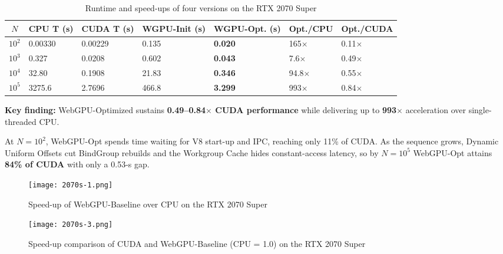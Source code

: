 \documentclass[PhD]{PHlab-thesis}
\begin{document}
\begin{table}[h]
    \centering
    \begin{tabularx}{\textwidth}{|c|X|X|X|X|X|X|}
        \hline
        \setlength{\tabcolsep}{4pt}         %
        \renewcommand{\arraystretch}{2}   %
        \small    
        $N$ & CPU T (s) & CUDA T (s) & WGPU-Init (s) & \textbf{WGPU-Opt. (s)} & Opt./CPU & Opt./CUDA \\
        \hline
        $10^2$ & 0.00330 & 0.00229 & 0.135 & \textbf{0.020} & 165$\times$ & 0.11$\times$ \\
        $10^3$ & 0.327 & 0.0208 & 0.602 & \textbf{0.043} & 7.6$\times$ & 0.49$\times$ \\
        $10^4$ & 32.80 & 0.1908 & 21.83 & \textbf{0.346} & 94.8$\times$ & 0.55$\times$ \\
        $10^5$ & 3275.6 & 2.7696 & 466.8 & \textbf{3.299} & 993$\times$ & 0.84$\times$ \\
        \hline
    \end{tabularx}
    \caption{Runtime and speed-ups of four versions on the RTX 2070 Super}
    \label{tab:rtx_performance}
\end{table}

\textbf{Key finding:} WebGPU-Optimized sustains \textbf{0.49–0.84$\times$ CUDA performance} while delivering up to \textbf{993$\times$} acceleration over single-threaded CPU.

At $N=10^2$, WebGPU-Opt spends time waiting for V8 start-up and IPC, reaching only 11\% of CUDA.
As the sequence grows, Dynamic Uniform Offsets cut BindGroup rebuilds and the Workgroup Cache hides constant-access latency, so by $N=10^5$ WebGPU-Opt attains \textbf{84\% of CUDA} with only a 0.53-s gap.

\begin{figure}[htbp]
    \centering
    \texttt{[image: 2070s-1.png]}
    \caption{Speed-up of WebGPU-Baseline over CPU on the RTX 2070 Super}
    \label{fig:2070s-wgpu-baseline}
\end{figure}

\begin{figure}[htbp]
    \centering
    \texttt{[image: 2070s-3.png]}
    \caption{Speed-up comparison of CUDA and WebGPU-Baseline (CPU = 1.0) on the RTX 2070 Super}
    \label{fig:2070s-cuda-vs-baseline}
\end{figure}
\end{document}
